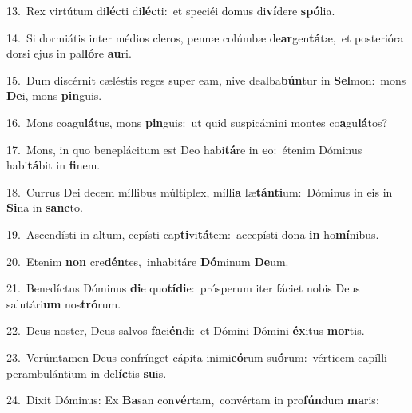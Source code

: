 {\numbfont\textcolor{\numbcolor}{13.}}~Rex virtútum di\-\textbf{léc}\-ti di\-\textbf{léc}\-ti:~\star et speciéi domus di\-\textbf{ví}\-dere \textbf{spó}\-lia.\par
{\numbfont\textcolor{\numbcolor}{14.}}~Si dormiátis inter médios cleros, pennæ colúmbæ de\-\textbf{ar}\-gen\-\textbf{tá}\-tæ,~\star et posterióra dorsi ejus in pal\-\textbf{ló}\-re \textbf{au}\-ri.\par
{\numbfont\textcolor{\numbcolor}{15.}}~Dum discérnit cæléstis reges super eam, nive dealba\-\textbf{bún}\-tur in \textbf{Sel}\-mon:~\star mons \textbf{De}\-i, mons \textbf{pin}\-guis.\par
{\numbfont\textcolor{\numbcolor}{16.}}~Mons coagu\-\textbf{lá}\-tus, mons \textbf{pin}\-guis:~\star ut quid suspicámini montes co\-\textbf{a}\-gu\-\textbf{lá}\-tos?\par
{\numbfont\textcolor{\numbcolor}{17.}}~Mons, in quo beneplácitum est Deo habi\-\textbf{tá}\-re in \textbf{e}\-o:~\star étenim Dóminus habi\-\textbf{tá}\-bit in \textbf{fi}\-nem.\par
{\numbfont\textcolor{\numbcolor}{18.}}~Currus Dei decem míllibus múltiplex, mílli\textbf{a} læ\-\textbf{tán}\-\textbf{ti}um:~\star Dóminus in eis in \textbf{Si}\-na in \textbf{sanc}\-to.\par
{\numbfont\textcolor{\numbcolor}{19.}}~Ascendísti in altum, cepísti cap\-\textbf{ti}\-vi\-\textbf{tá}\-tem:~\star accepísti dona \textbf{in} ho\-\textbf{mí}\-nibus.\par
{\numbfont\textcolor{\numbcolor}{20.}}~Etenim \textbf{non} cre\-\textbf{dén}\-tes,~\star inhabitáre \textbf{Dó}\-minum \textbf{De}\-um.\par
{\numbfont\textcolor{\numbcolor}{21.}}~Benedíctus Dóminus \textbf{di}\-e quo\-\textbf{tí}\-\textbf{di}e:~\star prósperum iter fáciet nobis Deus salutári\textbf{um} nos\-\textbf{tró}\-rum.\par
{\numbfont\textcolor{\numbcolor}{22.}}~Deus noster, Deus salvos \textbf{fa}\-ci\-\textbf{én}\-di:~\star et Dómini Dómini \textbf{éx}\-itus \textbf{mor}\-tis.\par
{\numbfont\textcolor{\numbcolor}{23.}}~Verúmtamen Deus confrínget cápita inimi\-\textbf{có}\-rum su\-\textbf{ó}\-rum:~\star vérticem capílli perambulántium in de\-\textbf{líc}\-tis \textbf{su}\-is.\par
{\numbfont\textcolor{\numbcolor}{24.}}~Dixit Dóminus: Ex \textbf{Ba}\-san con\-\textbf{vér}\-tam,~\star convértam in pro\-\textbf{fún}\-dum \textbf{ma}\-ris:\par
